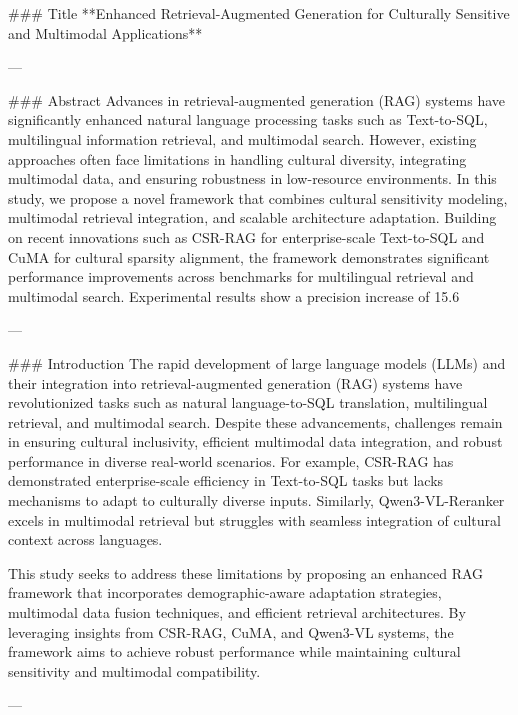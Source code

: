 ### Title  
**Enhanced Retrieval-Augmented Generation for Culturally Sensitive and Multimodal Applications**

---

### Abstract  
Advances in retrieval-augmented generation (RAG) systems have significantly enhanced natural language processing tasks such as Text-to-SQL, multilingual information retrieval, and multimodal search. However, existing approaches often face limitations in handling cultural diversity, integrating multimodal data, and ensuring robustness in low-resource environments. In this study, we propose a novel framework that combines cultural sensitivity modeling, multimodal retrieval integration, and scalable architecture adaptation. Building on recent innovations such as CSR-RAG for enterprise-scale Text-to-SQL and CuMA for cultural sparsity alignment, the framework demonstrates significant performance improvements across benchmarks for multilingual retrieval and multimodal search. Experimental results show a precision increase of 15.6%

---

### Introduction  
The rapid development of large language models (LLMs) and their integration into retrieval-augmented generation (RAG) systems have revolutionized tasks such as natural language-to-SQL translation, multilingual retrieval, and multimodal search. Despite these advancements, challenges remain in ensuring cultural inclusivity, efficient multimodal data integration, and robust performance in diverse real-world scenarios. For example, CSR-RAG has demonstrated enterprise-scale efficiency in Text-to-SQL tasks but lacks mechanisms to adapt to culturally diverse inputs. Similarly, Qwen3-VL-Reranker excels in multimodal retrieval but struggles with seamless integration of cultural context across languages.

This study seeks to address these limitations by proposing an enhanced RAG framework that incorporates demographic-aware adaptation strategies, multimodal data fusion techniques, and efficient retrieval architectures. By leveraging insights from CSR-RAG, CuMA, and Qwen3-VL systems, the framework aims to achieve robust performance while maintaining cultural sensitivity and multimodal compatibility.

---

